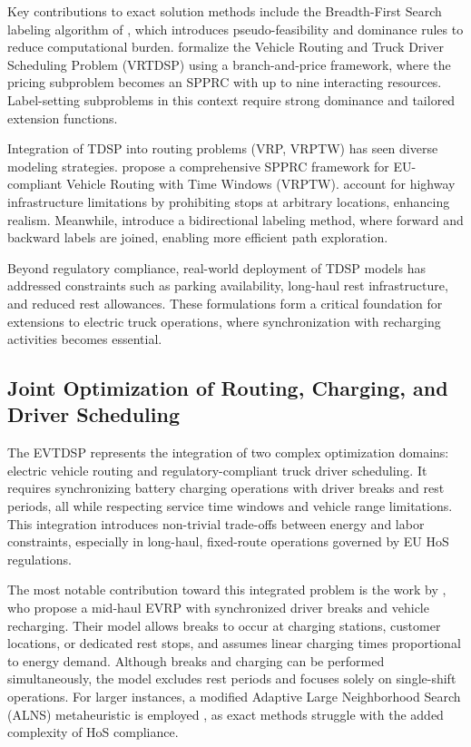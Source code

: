 \documentclass[trsc,dblanonrev]{informs4}
\begin{document}
Key contributions to exact solution methods include the Breadth-First Search labeling algorithm of \citet{goel2010truck}, which introduces pseudo-feasibility and dominance rules to reduce computational burden. \citet{goel2017exact} formalize the Vehicle Routing and Truck Driver Scheduling Problem (VRTDSP) using a branch-and-price framework, where the pricing subproblem becomes an SPPRC with up to nine interacting resources. Label-setting subproblems in this context require strong dominance and tailored extension functions.

Integration of TDSP into routing problems (VRP, VRPTW) has seen diverse modeling strategies. \citet{drexl2010labelling} propose a comprehensive SPPRC framework for EU-compliant Vehicle Routing with Time Windows (VRPTW). \citet{goel2012efficient} account for highway infrastructure limitations by prohibiting stops at arbitrary locations, enhancing realism. Meanwhile, \citet{tilk2020bidirectional} introduce a bidirectional labeling method, where forward and backward labels are joined, enabling more efficient path exploration.

Beyond regulatory compliance, real-world deployment of TDSP models has addressed constraints such as parking availability, long-haul rest infrastructure, and reduced rest allowances. These formulations form a critical foundation for extensions to electric truck operations, where synchronization with recharging activities becomes essential.


\subsection{Joint Optimization of Routing, Charging, and Driver Scheduling}

The EVTDSP represents the integration of two complex optimization domains: electric vehicle routing and regulatory-compliant truck driver scheduling. It requires synchronizing battery charging operations with driver breaks and rest periods, all while respecting service time windows and vehicle range limitations. This integration introduces non-trivial trade-offs between energy and labor constraints, especially in long-haul, fixed-route operations governed by EU HoS regulations.

The most notable contribution toward this integrated problem is the work by \citet{schiffer2017impact}, who propose a mid-haul EVRP with synchronized driver breaks and vehicle recharging. Their model allows breaks to occur at charging stations, customer locations, or dedicated rest stops, and assumes linear charging times proportional to energy demand. Although breaks and charging can be performed simultaneously, the model excludes rest periods and focuses solely on single-shift operations. For larger instances, a modified Adaptive Large Neighborhood Search (ALNS) metaheuristic is employed \citep{schiffer2017solution}, as exact methods struggle with the added complexity of HoS compliance.
\end{document}

